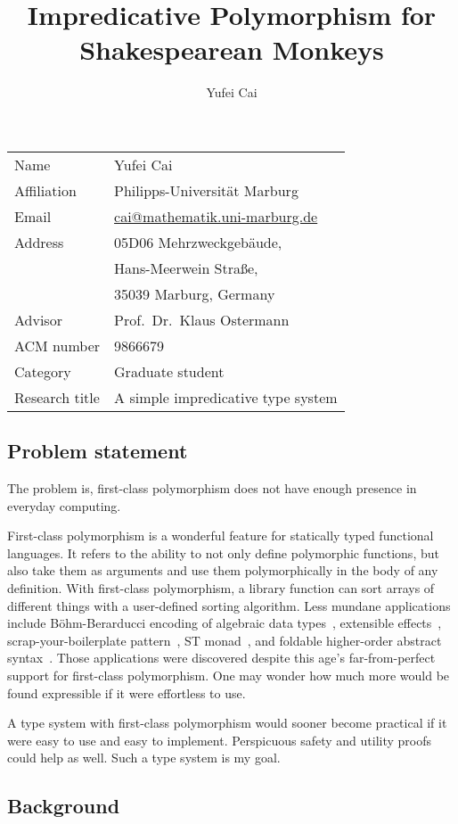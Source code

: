 \documentclass{amsart}
\title
{Impredicative Polymorphism\break
for Shakespearean Monkeys}
\author{Yufei Cai}
\begin{document}
\def\OK{\\[5pt]}
\begin{tabular}{ll}
Name & Yufei Cai\OK
Affiliation & Philipps-Universit\"at Marburg\OK
Email & \url{cai@mathematik.uni-marburg.de} \OK
Address & 05D06 Mehrzweckgeb\"aude,\\
              & Hans-Meerwein Stra\ss e,\\
              & 35039 Marburg, Germany \OK
Advisor & Prof.\ Dr.\ Klaus Ostermann \OK
ACM number & 9866679 \OK
Category & Graduate student \OK
Research title & A simple impredicative type system
\end{tabular}

\bigbreak

\subsection{Problem statement}

The problem is, first-class polymorphism does not have enough
presence in everyday computing.

First-class polymorphism is a wonderful feature for statically
typed functional languages. It refers to the ability to not only
define polymorphic functions, but also take them as arguments and
use them polymorphically in the body of any definition. With
first-class polymorphism, a library function can sort arrays of
different things with a user-defined sorting algorithm. Less
mundane applications include B\"ohm-Berarducci encoding of
algebraic data types~\cite{Boehm85}, extensible
effects~\cite{Kiselyov13}, scrap-your-boilerplate
pattern~\cite{Laemmel03}, ST monad~\cite{Launchbury94}, and
foldable higher-order abstract syntax~\cite{Washburn03}. Those
applications were discovered despite this age's far-from-perfect
support for first-class polymorphism. One may wonder how much
more would be found expressible if it were effortless to use.

A type system with first-class polymorphism would sooner become
practical if it were easy to use and easy to implement.
Perspicuous safety and utility proofs could help as well. Such a
type system is my goal.

\subsection{Background}
\end{document}
